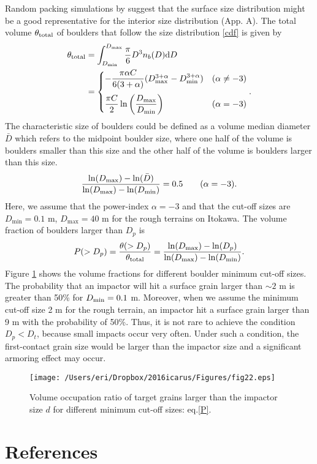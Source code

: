 \documentclass[3p,authoryear]{elsarticle}
\renewcommand{\d}{{\rm{d}}}
\begin{document}
Random packing simulations by \citet{tancredi2015} suggest that the surface size distribution might be a good representative for the interior size distribution (App. A).
The total volume $\theta_{\rm total}$ of boulders that follow the size distribution \eqref{cdf} is given by
\begin{align}
	\theta_\text{total}&=\int_{D_{\rm min}}^{D_{\rm max}} \frac{\pi}{6} D^3 n_b(D) {\rm d} D \notag \\
	&=\begin{cases} -\dfrac{\pi \alpha C}{6(3+\alpha)} (D_{\rm max}^{3+\alpha}-D_{\rm min}^{3+\alpha})& (\alpha\neq -3) \medskip\\
	\dfrac{\pi C}{2}\ln\left(\dfrac{D_{\rm max}}{D_{\rm min}}\right) & (\alpha=-3) \end{cases} .
\end{align}
The characteristic size of boulders could be defined as a volume median diameter $\bar{D}$ which refers to the midpoint boulder size, where one half of the volume is boulders smaller than this size and the other half of the volume is boulders larger than this size.
\begin{equation}
	\frac{\ln (D_{\rm max})-\ln (\bar{D})}{\ln (D_{\rm max})-\ln (D_{\rm min})}=0.5\qquad (\alpha=-3).
\end{equation}
Here, we assume that the power-index $\alpha =-3$ and that the cut-off sizes are $D_\text{min}=0.1$ m, $D_\text{max}=40$ m for the rough terrains on Itokawa.
The volume fraction of boulders larger than $D_p$ is
\begin{equation}
	P(>D_p) = \frac{\theta(>D_p)}{\theta_\text{total}}=\frac{\ln (D_{\rm max})-\ln (D_p)}{\ln (D_{\rm max})-\ln (D_{\rm min})}. \label{P}
\end{equation}
Figure \ref{graph-P} shows the volume fractions for different boulder minimum cut-off sizes.
The probability that an impactor will hit a surface grain larger than $\sim2$ m is greater than 50\% for $D_{\rm min}=0.1$ m.
Moreover, when we assume the minimum cut-off size 2 m for the rough terrain, an impactor hit a surface grain larger than 9 m with the probability of 50\%.
Thus, it is not rare to achieve the condition $D_p<D_t$, because small impacts occur very often.
Under such a condition, the first-contact grain size would be larger than the impactor size and a significant armoring effect may occur.
\begin{figure}[htbp]
	\begin{center}
	\texttt{[image: /Users/eri/Dropbox/2016icarus/Figures/fig22.eps]}
	\caption{Volume occupation ratio of target grains larger than the impactor size $d$ for different minimum cut-off sizes: eq.\eqref{P}.}
	\label{graph-P}
	\end{center}
\end{figure}


\section*{References}

\end{document}
